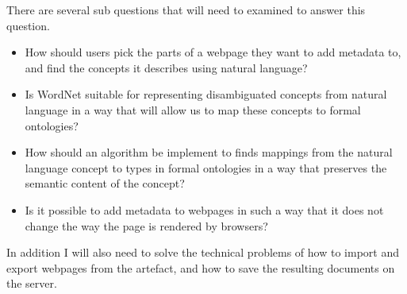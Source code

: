 There are several sub questions that will need to examined to answer this question.
\begin{itemize}
	\item How should users pick the parts of a webpage they want to add metadata to, and find the concepts it describes using natural language?
	\item Is WordNet suitable for representing disambiguated concepts from natural language in a way that will allow us to map these concepts to formal ontologies?
	\item How should an algorithm be implement to finds mappings from the natural language concept to types in
			formal ontologies in a way that preserves the semantic content of the concept?
	\item Is it possible to add metadata to webpages in such a way that it does not change the way the page is rendered by browsers?
\end{itemize}

In addition I will also need to solve the technical problems of how to import and export webpages from the artefact,
and how to save the resulting documents on the server.


%
%
%
%

